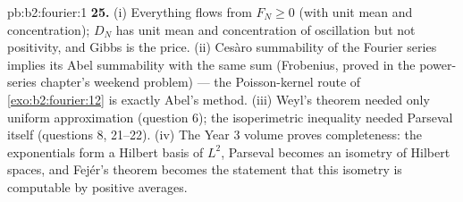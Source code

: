 \begin{solution}{pb:b2:fourier:1}
\textbf{25.} (i) Everything flows from $F_N \geq 0$ (with unit
mean and concentration); $D_N$ has unit mean and concentration
of oscillation but not positivity, and Gibbs is the price.
(ii) Ces\`aro summability of the Fourier series implies its
Abel summability with the same sum (Frobenius, proved in the
power-series chapter's weekend problem) --- the Poisson-kernel
route of \cref{exo:b2:fourier:12} is exactly Abel's method.
(iii) Weyl's theorem needed only uniform approximation
(question 6); the isoperimetric inequality needed Parseval
itself (questions 8, 21--22). (iv) The Year 3 volume proves
completeness: the exponentials form a Hilbert basis of $L^2$,
Parseval becomes an isometry of Hilbert spaces, and Fej\'er's
theorem becomes the statement that this isometry is computable
by positive averages.
\end{solution}
